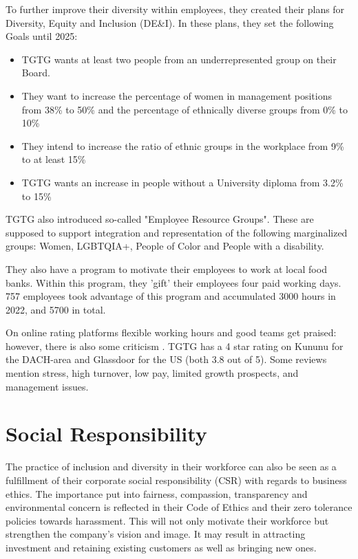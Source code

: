 \documentclass{article}
\begin{document}
To further improve their diversity within employees, they created their plans
for Diversity, Equity and Inclusion (DE\&I). In these plans, they set the
following Goals until 2025: \begin{itemize} \item TGTG wants at least two
			people from an underrepresented group on their Board. \item They want to
				increase the percentage of women in management positions from 38\% to
				50\% and the percentage of ethnically diverse groups from 0\% to 10\%
			\item They intend to increase the ratio of ethnic groups in the workplace
				from 9\% to at least 15\% \item TGTG wants an increase in people
				without a University diploma from 3.2\% to 15\% \cite{impact}
\end{itemize}

TGTG also introduced so-called "Employee Resource Groups". These are supposed
to support integration and representation of the following marginalized groups:
Women, LGBTQIA+, People of Color and People with a disability. \cite{impact}

They also have a program to motivate their employees to work at  local food
banks. Within this program, they 'gift' their employees four paid working days.
757 employees took advantage of this program and accumulated 3000 hours in
2022, and 5700 in total. \cite{impact}

On online rating platforms flexible working hours and good teams get praised:
however, there is also some criticism \cite{kanunugermany}. TGTG has a 4 star
rating on Kununu for the DACH-area and Glassdoor for the US (both 3.8 out of
5). Some reviews mention stress, high turnover, low pay, limited growth
prospects, and management issues. 
\cite{kanunuus} \cite{kanunuaustria} \cite{kanunuswitzerland}

\section{Social Responsibility}

The practice of inclusion and diversity in their workforce can also be seen as
a fulfillment of their corporate social responsibility (CSR) with regards to
business ethics. The importance put into fairness, compassion, transparency and
environmental concern is reflected in their Code of Ethics and their zero tolerance
policies towards harassment.\cite{impact} This will not only motivate their
workforce but strengthen the company’s vision and image. It may result in
attracting investment and retaining existing customers as well as bringing new
ones.
\end{document}
